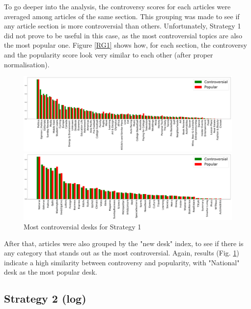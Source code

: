 To go deeper into the analysis, the controversy scores for each articles were averaged among articles of the same section. This grouping was made to see if any article section is more controversial than others. Unfortunately, Strategy 1 did not prove to be useful in this case, as the most controversial topics are also the most popular one. Figure \ref{RG1} shows how, for each section, the controversy and the popularity score look very similar to each other (after proper normalisation).

\begin{figure}[htb]
\centering
\includegraphics[width=\tw]{Pictures/Strat1SN.pdf}
\caption{Most controversial sections for Strategy 1}
\label{RG1}
\centering
\includegraphics[width=\tw]{Pictures/Strat1ND.pdf}
\caption{Most controversial desks for Strategy 1}
\label{RG1nd}
\end{figure}

After that, articles were also grouped by the "new desk" index, to see if there is any category that stands out as the most controversial. Again, results (Fig. \ref{RG1nd}) indicate a high similarity between controversy and popularity, with "National" desk as the most popular desk.



\subsection{Strategy 2 (log)}

